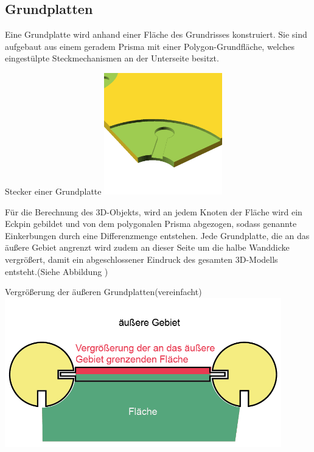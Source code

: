 \subsection{Grundplatten}
Eine Grundplatte wird anhand einer Fläche des Grundrisses konstruiert.
Sie sind aufgebaut aus einem geradem Prisma mit einer Polygon-Grundfläche, welches eingestülpte Steckmechanismen an der Unterseite besitzt.
\begin{Bild}{Stecker einer Grundplatte}
	\includegraphics[height=200px]{Bilder/Untereinheit_GP}
\end{Bild}
Für die Berechnung des 3D-Objekts, wird an jedem Knoten der Fläche wird ein Eckpin gebildet und von dem polygonalen Prisma abgezogen, sodass genannte Einkerbungen durch eine Differenzmenge entstehen. 
Jede Grundplatte, die an das äußere Gebiet angrenzt wird zudem an dieser Seite um die halbe Wanddicke vergrößert, damit ein abgeschlossener Eindruck des gesamten 3D-Modells entsteht.(Siehe Abbildung \thebildnr)
\begin{Bild}{Vergrößerung der äußeren Grundplatten(vereinfacht)}
	\includegraphics[width=120mm]{Bilder/GrundplatteVergroesserung-08}
\end{Bild}

